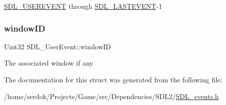 \hyperlink{SDL__events_8h_a3b589e89be6b35c02e0dd34a55f3fccaa4364c23f54802309e83fdb9b1c07c719}{S\+D\+L\+\_\+\+U\+S\+E\+R\+E\+V\+E\+NT} through \hyperlink{SDL__events_8h_a3b589e89be6b35c02e0dd34a55f3fccaaffeac40a4ff366717c0ebc74118ea2ae}{S\+D\+L\+\_\+\+L\+A\+S\+T\+E\+V\+E\+NT}-\/1 \mbox{\label{structSDL__UserEvent_abccefa10e0e0e3a0801bc6d836a08da7}} 
\subsubsection{\texorpdfstring{window\+ID}{windowID}}
{\footnotesize\ttfamily Uint32 S\+D\+L\+\_\+\+User\+Event\+::window\+ID}

The associated window if any 

The documentation for this struct was generated from the following file\+:\begin{DoxyCompactItemize}
\item 
/home/serdok/\+Projects/\+Game/src/\+Dependencies/\+S\+D\+L2/\hyperlink{SDL__events_8h}{S\+D\+L\+\_\+events.\+h}\end{DoxyCompactItemize}
